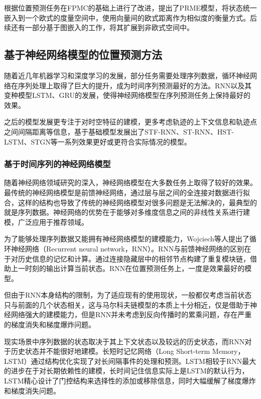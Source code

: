 \documentclass[master]{thesis-uestc}
\begin{document}
根据位置预测任务在FPMC的基础上进行了改进，提出了PRME模型，将状态统一嵌入到一个欧式的度量空间中，使用向量间的欧式距离作为相似度的衡量方式。后续还有一部分基于图嵌入的工作，将其扩展到非欧式空间中。

\subsection{基于神经网络模型的位置预测方法}
随着近几年机器学习和深度学习的发展，部分任务需要处理序列数据，循环神经网络在序列处理上取得了巨大的提升，成为时间序列预测最好的方法。RNN以及其变种模型LSTM、GRU的发展，使得神经网络模型在序列预测任务上保持最好的效果。

之后的模型发展更专注于对时空特征的建模，更多考虑轨迹的上下文信息和轨迹点之间间隔距离等信息，基于基础模型发展出了STF-RNN、ST-RNN、HST-LSTM、STGN等一系列效果更好或更符合实际情况的模型。

\subsubsection{基于时间序列的神经网络模型}
随着神经网络领域研究的深入，神经网络模型在大多数任务上取得了较好的效果。最传统的神经网络模型是前馈神经网络，通过层与层之间的全连接对数据进行拟合，这样的结构也导致了传统的神经网络模型对很多问题是无法解决的，最典型的就是序列数据。神经网络的优势在于能够对多维度信息之间的非线性关系进行建模，广泛应用于推荐领域。

为了能够处理序列数据又能拥有神经网络模型的建模能力，Wojciech等人提出了循环神经网络（Recurrent neural network，RNN）。RNN与前馈神经网络的区别在于对历史信息的记忆和计算。通过连接隐藏层中的相邻节点构建了重复模块链，借助上一时刻的输出计算当前状态。RNN在位置预测任务上，一度是效果最好的模型。

但由于RNN本身结构的限制，为了适应现有的使用现状，一般都仅考虑当前状态只与前面的几个状态相关，这与马尔科夫链模型的本质上十分相近，仅是借助于神经网络强大的建模能力，但是RNN并未考虑到反向传播时的累乘问题，存在严重的梯度消失和梯度爆炸问题。

现实场景中序列数据的状态取决于其上下文状态以及较远的历史状态，而RNN对于历史状态并不能很好地建模。长短时记忆网络（Long Short-term Memory，LSTM）通过结构优化实现了对长间隔事件的处理和预测。LSTM相较于RNN最大的进步在于对长期依赖性的建模，长时间记住信息实际上是LSTM的默认行为，LSTM精心设计了门控结构来选择性的添加或移除信息，同时大幅缓解了梯度爆炸和梯度消失问题。
\end{document}
